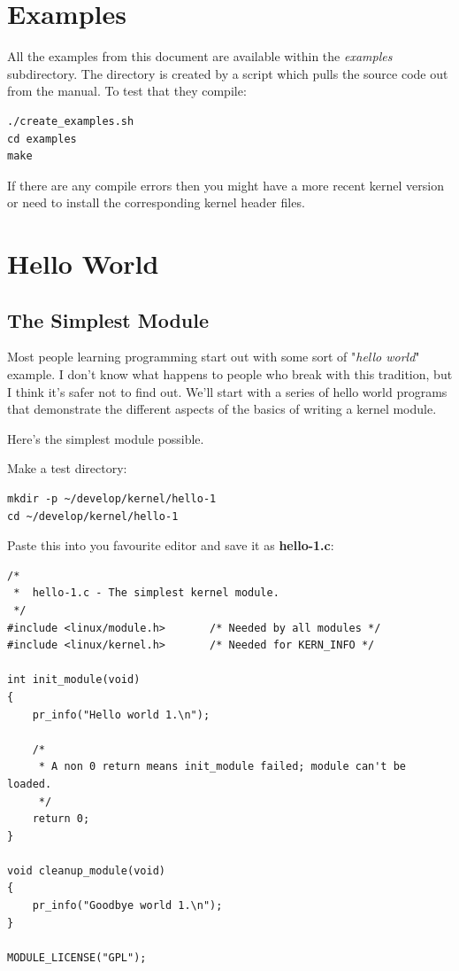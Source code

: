 \documentclass[11pt]{article}
\begin{document}
\section{Examples}
\label{sec:org34848a0}
All the examples from this document are available within the \emph{examples} subdirectory. The directory is created by a script which pulls the source code out from the manual. To test that they compile:

\begin{verbatim}
./create_examples.sh
cd examples
make
\end{verbatim}

If there are any compile errors then you might have a more recent kernel version or need to install the corresponding kernel header files.
\section{Hello World}
\label{sec:org7bd7fa4}
\subsection{The Simplest Module}
\label{sec:org2d3e245}
Most people learning programming start out with some sort of "\emph{hello world}" example. I don't know what happens to people who break with this tradition, but I think it's safer not to find out. We'll start with a series of hello world programs that demonstrate the different aspects of the basics of writing a kernel module.

Here's the simplest module possible.

Make a test directory:

\begin{verbatim}
mkdir -p ~/develop/kernel/hello-1
cd ~/develop/kernel/hello-1
\end{verbatim}

Paste this into you favourite editor and save it as \textbf{hello-1.c}:

\begin{verbatim}
/*
 *  hello-1.c - The simplest kernel module.
 */
#include <linux/module.h>       /* Needed by all modules */
#include <linux/kernel.h>       /* Needed for KERN_INFO */

int init_module(void)
{
    pr_info("Hello world 1.\n");

    /*
     * A non 0 return means init_module failed; module can't be loaded.
     */
    return 0;
}

void cleanup_module(void)
{
    pr_info("Goodbye world 1.\n");
}

MODULE_LICENSE("GPL");
\end{verbatim}
\end{document}
